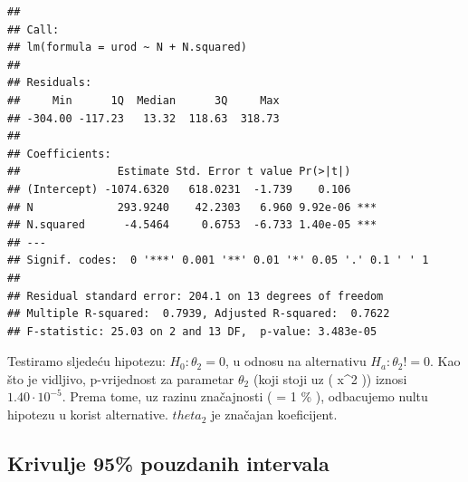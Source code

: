 \documentclass[]{article}
\newenvironment{Shaded}{\begin{snugshade}}{\end{snugshade}}
\newcommand{\KeywordTok}[1]{\textcolor[rgb]{0.13,0.29,0.53}{\textbf{{#1}}}}
\newcommand{\DataTypeTok}[1]{\textcolor[rgb]{0.13,0.29,0.53}{{#1}}}
\newcommand{\DecValTok}[1]{\textcolor[rgb]{0.00,0.00,0.81}{{#1}}}
\newcommand{\StringTok}[1]{\textcolor[rgb]{0.31,0.60,0.02}{{#1}}}
\newcommand{\OtherTok}[1]{\textcolor[rgb]{0.56,0.35,0.01}{{#1}}}
\newcommand{\NormalTok}[1]{{#1}}
\begin{document}
\begin{verbatim}
## 
## Call:
## lm(formula = urod ~ N + N.squared)
## 
## Residuals:
##     Min      1Q  Median      3Q     Max 
## -304.00 -117.23   13.32  118.63  318.73 
## 
## Coefficients:
##               Estimate Std. Error t value Pr(>|t|)    
## (Intercept) -1074.6320   618.0231  -1.739    0.106    
## N             293.9240    42.2303   6.960 9.92e-06 ***
## N.squared      -4.5464     0.6753  -6.733 1.40e-05 ***
## ---
## Signif. codes:  0 '***' 0.001 '**' 0.01 '*' 0.05 '.' 0.1 ' ' 1
## 
## Residual standard error: 204.1 on 13 degrees of freedom
## Multiple R-squared:  0.7939, Adjusted R-squared:  0.7622 
## F-statistic: 25.03 on 2 and 13 DF,  p-value: 3.483e-05
\end{verbatim}

Testiramo sljedeću hipotezu: \(H_0 : \theta_2 = 0\), u odnosu na
alternativu \(H_a : \theta_2 != 0\). Kao što je vidljivo, p-vrijednost
za parametar \(\theta_2\) (koji stoji uz ( x\^{}2 )) iznosi
\(1.40\cdot10^{-5}\). Prema tome, uz razinu značajnosti ( \alpha = 1 \%
), odbacujemo nultu hipotezu u korist alternative. \(theta_2\) je
značajan koeficijent.

\subsection{Krivulje 95\% pouzdanih
intervala}\label{krivulje-95-pouzdanih-intervala-1}

\begin{Shaded}
\end{Shaded}
\end{document}
